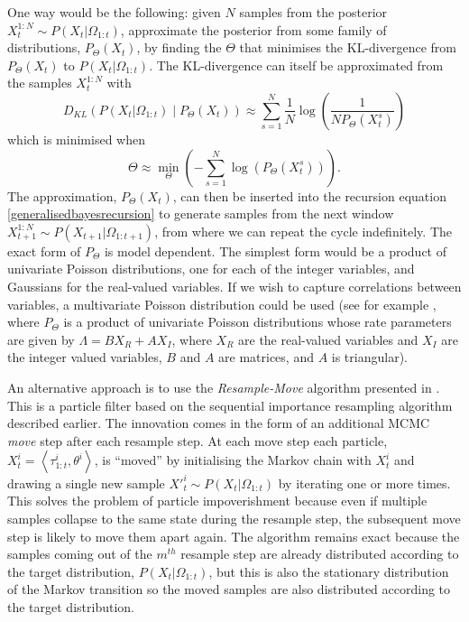 \documentclass{article}
\begin{document}
One way would be the following: given $N$ samples from the posterior $X^{1:N}_{t} \sim P(X_{t}|\Omega_{1:t})$, approximate the posterior from some family of distributions, $P_\Theta(X_t)$, by finding the $\Theta$ that minimises the KL-divergence from $P_\Theta(X_t)$ to $P(X_{t}|\Omega_{1:t})$. The KL-divergence can itself be approximated from the samples $X^{1:N}_t$ with
\[
D_{KL}\left(P(X_{t}|\Omega_{1:t}) \mid P_\Theta(X_t)  \right) \approx
\sum_{s=1}^N \frac{1}{N}\log\left(\frac{1}{N P_\Theta(X^s_t)}\right)
\]
which is minimised when
\[
\Theta \approx \min_\Theta \left(-\sum_{s=1}^N \log\left(P_\Theta\left(X^s_t\right)\right) \right).
\]
The approximation, $P_\Theta(X_t)$, can then be inserted into the recursion equation \eqref{generalisedbayesrecursion} to generate samples from the next window $X^{1:N}_{t+1} \sim P(X_{t+1}|\Omega_{1:t+1})$, from where we can repeat the cycle indefinitely. The exact form of $P_\Theta$ is model dependent. The simplest form would be a product of univariate Poisson distributions, one for each of the integer variables, and Gaussians for the real-valued variables. If we wish to capture correlations between variables, a multivariate Poisson distribution could be used (see for example \citet{munoz2021multivariate}, where $P_\Theta$ is a product of univariate Poisson distributions whose rate parameters are given by $\Lambda = B X_R + A X_I$, where $X_R$ are the real-valued variables and $X_I$ are the integer valued variables, $B$ and $A$ are matrices, and $A$ is triangular).

An alternative approach is to use the \textit{Resample-Move} algorithm presented in \citet{gilks2001following}. This is a particle filter based on the sequential importance resampling algorithm described earlier. The innovation comes in the form of an additional MCMC \textit{move} step after each resample step. At each move step each particle, $X^i_t = \left<\tau_{1:t}^i,\theta^i\right>$, is ``moved'' by initialising the Markov chain with $X^i_t$ and drawing a single new sample $X'^{i}_{t} \sim P(X_t|\Omega_{1:t})$ by iterating one or more times. This solves the problem of particle impoverishment because even if multiple samples collapse to the same state during the resample step, the subsequent move step is likely to move them apart again. The algorithm remains exact because the samples coming out of the $m^{th}$ resample step are already distributed according to the target distribution, $P(X_t|\Omega_{1:t})$, but this is also the stationary distribution of the Markov transition so the moved samples are also distributed according to the target distribution.
\end{document}
